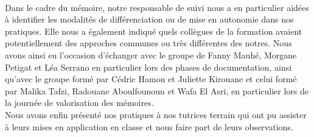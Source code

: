\paragraph*{}
Dans le cadre du mémoire, notre responsable de suivi nous a en particulier aidées à identifier les modalités de différenciation ou de mise en autonomie dans nos pratiques. Elle nous a également indiqué quels collègues de la formation avaient potentiellement des approches communes ou très différentes des notres. Nous avons ainsi eu l'occasion d'échanger avec le groupe de Fanny Mauhé, Morgane Petigat et Léa Serrano\cite{memoire_fanny} en particulier lors des phases de documentation, ainsi qu'avec le groupe formé par Cédric Hamon et Juliette Kirouane\cite{memoire_eval_differenciee} et celui formé par Malika Tafzi, Radouane Aboulfounoun et Wafa El Asri\cite{memoire_Malika}, en particulier lors de la journée de valorisation des mémoires.\\
Nous avons enfin présenté nos pratiques à nos tutrices terrain qui ont pu assister à leurs mises en application en classe et nous faire part de leurs observations.
